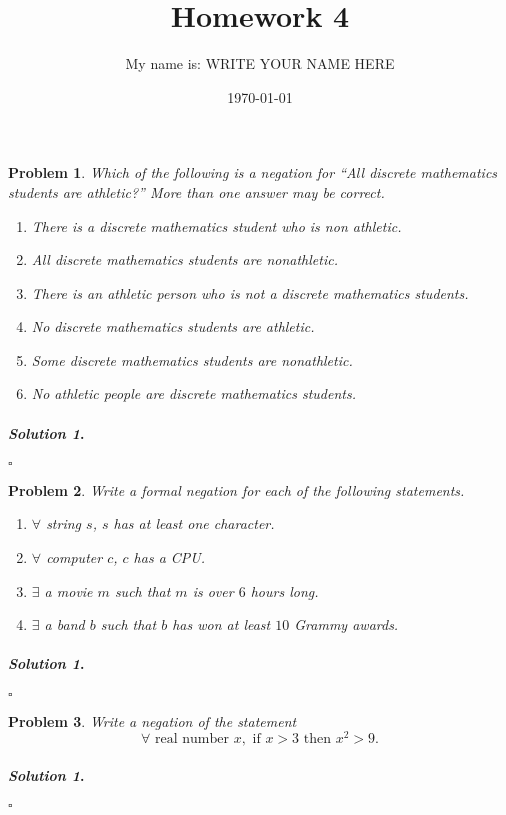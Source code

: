\documentclass{amsart}
\theoremstyle{plain}
\newtheorem{problem}{Problem}
\newenvironment{solution}{\paragraph{\emph{Solution 1}.}}{\hfill$\square$}
\begin{document}
 

\title[Homework 4]{Homework 4}
\author{My name is:  WRITE YOUR NAME HERE}  %
\date{\today} 
\maketitle 

\begin{problem}
Which of the following is a negation for ``All discrete mathematics students are athletic?''  More than one answer may be correct.
\begin{enumerate}
\item There is a discrete mathematics student who is non athletic.
\item All discrete mathematics students are nonathletic.
\item There is an athletic person who is not a discrete mathematics students.
\item No discrete mathematics students are athletic.
\item Some discrete mathematics students are nonathletic.
\item No athletic people are discrete mathematics students.
\end{enumerate}
\end{problem}
\begin{solution}
\end{solution}

\begin{problem}
Write a formal negation for each of the following statements.
\begin{enumerate}
\item $\forall$ string $s$, $s$ has at least one character.
\item $\forall$ computer $c$, $c$ has a CPU.
\item $\exists$ a movie $m$ such that $m$ is over $6$ hours long.
\item $\exists$ a band $b$ such that $b$ has won at least $10$ Grammy awards.
\end{enumerate}
\end{problem}
\begin{solution}
\end{solution}

\begin{problem}
Write a negation of the statement
$$\forall\text{ real number }x, \text{ if }x>3 \text{ then } x^{2}>9. $$
\end{problem}
\begin{solution}
\end{solution}
\end{document}
